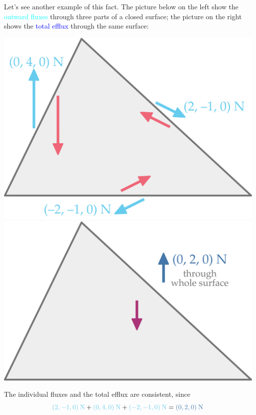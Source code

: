 \documentclass[a4paper,12pt,%
onecolumn,oneside,titlepage,%
british%
]{memoir}
\renewcommand*{\|}[1][]{\nonscript\:#1\vert\nonscript\:\mathopen{}}
\begin{document}
Let's see another example of this fact. The picture below on the left show the \textcolor{cyan}{outward fluxes} through three parts of a closed surface; the picture on the right shows the \textcolor{blue}{total efflux} through the same surface:
\begin{center}
  \hspace*{\fill}
  \includegraphics[align=t,width=0.4\linewidth]{flux_closed_3.pdf}
  \hfill
  \includegraphics[align=t,width=0.4\linewidth]{flux_closed_3_sum.pdf}
  \hspace*{\fill}
\end{center}
The individual fluxes and the total efflux are consistent, since
\begin{equation*}
  \mathcolor{cyan}{(2,-1,0)\:\unit{N}} +
  \mathcolor{cyan}{(0,4,0)\:\unit{N}} +
  \mathcolor{cyan}{(-2,-1,0)\:\unit{N}} =
  \mathcolor{blue}{(0,2,0)\:\unit{N}}
\end{equation*}



\bigskip
\end{document}
